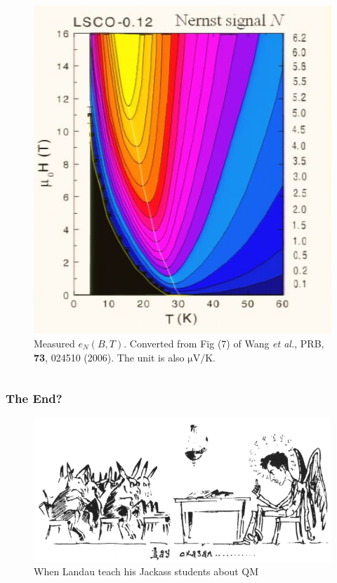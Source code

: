 \documentclass[10pt,aspectratio=43,xcolor=x11names,t]{beamer}%
\begin{document}
\begin{frame}
\begin{columns}
\begin{column}{0.45\textwidth}
\begin{figure}[!htp]
						\includegraphics[scale=0.31]{Wang.png}
						\caption{Measured $e_N(B,T)$. Converted from Fig (7) of {\scriptsize Wang \textit{et al.}, PRB, \textbf{73}, 024510 (2006)}. The unit is also $\mathrm{\mu V/K}$.}
					\end{figure}
				\end{column}
			\end{columns}
		\end{frame}

		\begin{frame}\frametitle{The End?}
			\begin{figure}[!htp]
				\centering
				\includegraphics[scale=0.6]{Landau.png}
				\caption{When Landau teach his Jackass students about QM}
			\end{figure}
		\end{frame}
\end{document}

